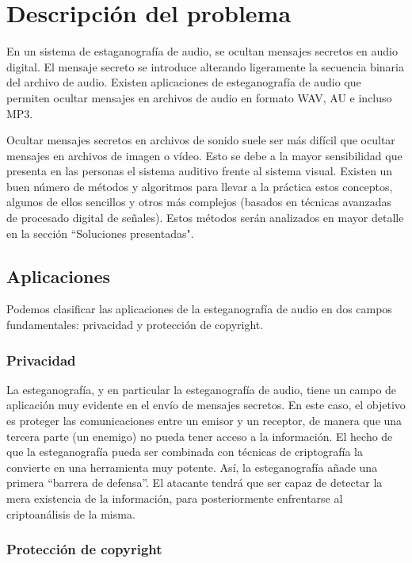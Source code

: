 \documentclass[12pt]{article}
\begin{document}
\section{Descripción del problema}

En un sistema de estaganografía de audio, se ocultan mensajes secretos en audio digital. El mensaje secreto se introduce alterando ligeramente la secuencia binaria del archivo de audio. Existen aplicaciones de esteganografía de audio que permiten ocultar mensajes en archivos de audio en formato WAV, AU e incluso MP3.

Ocultar mensajes secretos en archivos de sonido suele ser más difícil que ocultar mensajes en archivos de imagen o vídeo. Esto se debe a la mayor sensibilidad que presenta en las personas el sistema auditivo frente al sistema visual. Existen un buen número de métodos y algoritmos para llevar a la práctica estos conceptos, algunos de ellos sencillos y otros más complejos (basados en técnicas avanzadas de procesado digital de señales). Estos métodos serán analizados en mayor detalle en la sección ``Soluciones presentadas".

\subsection{Aplicaciones}

Podemos clasificar las aplicaciones de la esteganografía de audio en dos campos fundamentales: privacidad y protección de copyright.

\subsubsection{Privacidad}

La esteganografía, y en particular la esteganografía de audio, tiene un campo de aplicación muy evidente en el envío de mensajes secretos. En este caso, el objetivo es proteger las comunicaciones entre un emisor y un receptor, de manera que una tercera parte (un enemigo) no pueda tener acceso a la información. El hecho de que la esteganografía pueda ser combinada con técnicas de criptografía la convierte en una herramienta muy potente. Así, la esteganografía añade una primera ``barrera de defensa''. El atacante tendrá que ser capaz de detectar la mera existencia de la información, para posteriormente enfrentarse al criptoanálisis de la misma.

\subsubsection{Protección de copyright}
\end{document}
